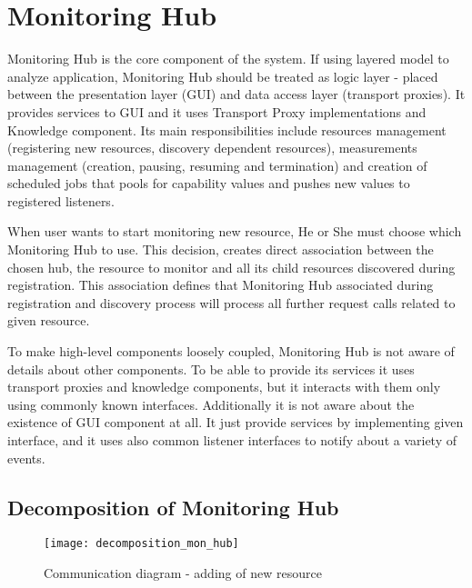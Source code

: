 %
\section{Monitoring Hub}
\label{sec:arch_monitoring_hub}

Monitoring Hub is the core component of the system. If using layered model to analyze application, Monitoring Hub should be treated as logic layer - placed between the presentation layer (GUI) and data access layer (transport proxies). It provides services to GUI and it uses Transport Proxy implementations and Knowledge component. Its main responsibilities include resources management (registering new resources, discovery dependent resources), measurements management (creation, pausing, resuming and termination) and creation of scheduled jobs that pools for capability values and pushes new values to registered listeners.

When user wants to start monitoring new resource, He or She must choose which Monitoring Hub to use. This decision, creates direct association between the chosen hub, the resource to monitor and all its child resources discovered during registration. This association defines that Monitoring Hub associated during registration and discovery process will process all further request calls related to given resource.

To make high-level components loosely coupled, Monitoring Hub is not aware of details about other components. To be able to provide its services it uses transport proxies and knowledge components, but it interacts with them only using commonly known interfaces. Additionally it is not aware about the existence of GUI component at all. It just provide services by implementing given interface, and it uses also common listener interfaces to notify about a variety of events.


\subsection{Decomposition of Monitoring Hub}

\begin{figure}[ht]
\centering
\texttt{[image: decomposition\_mon\_hub]}
\caption{Communication diagram - adding of new resource}
\label{fig:decomposition_mon_hub}
\end{figure}

